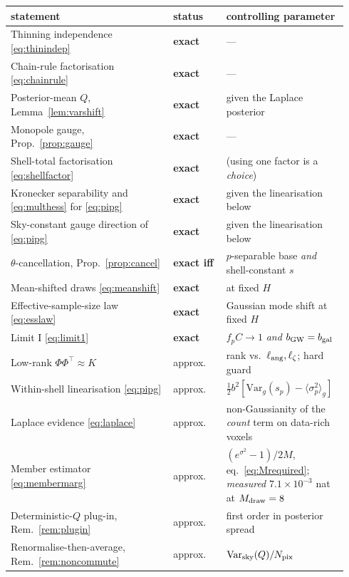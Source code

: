 \documentclass[11pt]{article}
\theoremstyle{definition}
\theoremstyle{remark}
\newcommand{\bgw}{b_{\rm GW}}
\newcommand{\bgal}{b_{\rm gal}}
\newcommand{\Mdraw}{M_{\rm draw}}
\newcommand{\Var}{\mathrm{Var}}
\newcommand{\Npix}{N_{\rm pix}}
\begin{document}
\begin{table}[h]
\centering\small
\begin{tabular}{p{0.46\linewidth}p{0.15\linewidth}p{0.33\linewidth}}
\toprule
statement & status & controlling parameter\\
\midrule
Thinning independence \eqref{eq:thinindep} & \textbf{exact} & --- \\
Chain-rule factorisation \eqref{eq:chainrule} & \textbf{exact} & --- \\
Posterior-mean $Q$, Lemma~\ref{lem:varshift} & \textbf{exact} & given the Laplace posterior \\
Monopole gauge, Prop.~\ref{prop:gauge} & \textbf{exact} & --- \\
Shell-total factorisation \eqref{eq:shellfactor} & \textbf{exact} & (using one factor is a \emph{choice}) \\
Kronecker separability and \eqref{eq:multhess} for \eqref{eq:pipg} & \textbf{exact} & given the linearisation below \\
Sky-constant gauge direction of \eqref{eq:pipg} & \textbf{exact} & given the linearisation below \\
$\theta$-cancellation, Prop.~\ref{prop:cancel} & \textbf{exact iff} & $p$-separable base \emph{and} shell-constant $s$ \\
Mean-shifted draws \eqref{eq:meanshift} & \textbf{exact} & at fixed $H$ \\
Effective-sample-size law \eqref{eq:esslaw} & \textbf{exact} & Gaussian mode shift at fixed $H$ \\
Limit I \eqref{eq:limit1} & \textbf{exact} & $f_pC\to1$ \emph{and} $\bgw=\bgal$ \\
\midrule
Low-rank $\Phi\Phi^{\!\top}\!\approx\!K$ & approx. & rank vs.\ $\ell_{\rm ang},\ell_\zeta$; hard guard \\
Within-shell linearisation \eqref{eq:pipg} & approx. & $\tfrac12b^2[\Var_g(s_p)-\langle\sigma^2_p\rangle_g]$ \\
Laplace evidence \eqref{eq:laplace} & approx. & non-Gaussianity of the \emph{count} term on data-rich voxels \\
Member estimator \eqref{eq:membermarg} & approx. & $(e^{\sigma^2}\!-\!1)/2M$, eq.~\eqref{eq:Mrequired}; \emph{measured} $7.1\times10^{-3}$ nat at $\Mdraw=8$ \\
Deterministic-$Q$ plug-in, Rem.~\ref{rem:plugin} & approx. & first order in posterior spread \\
Renormalise-then-average, Rem.~\ref{rem:noncommute} & approx. & $\Var_{\rm sky}(Q)/\Npix$ \\

\end{tabular}
\end{table}
\end{document}
